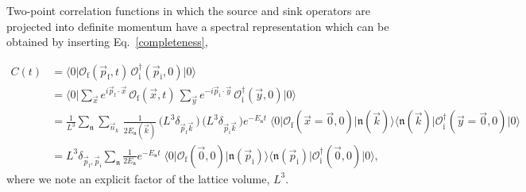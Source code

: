 \documentclass[twocolumn,amsmath,amssymb,prd,10pt,floatfix, 
superscriptaddress,nofootinbib, showpacs, preprintnumbers]{revtex4-1}
\begin{document}
Two-point correlation functions in which the source and sink operators are projected into definite momentum have a spectral representation which can be obtained by inserting Eq.~\ref{completeness},
\begin{widetext}
\begin{align*}
C(t) 	&= \big\langle 0 \big| \mathcal{O}^{\,}_\mathrm{f}(\vec{p}_{\mathrm{f}}, t) \, \mathcal{O}^\dag_\mathrm{i}(\vec{p}_\mathrm{i}, 0) \big| 0 \big\rangle \\ 
		&= \big\langle 0 \big| \sum\nolimits_{\vec{x}} e^{i \vec{p}_\mathrm{f}\cdot \vec{x} }\,  \mathcal{O}^{\,}_\mathrm{f}(\vec{x}, t)\, 
		\sum\nolimits_{\vec{y}} e^{-i \vec{p}_\mathrm{i}\cdot \vec{y} }\,  \mathcal{O}^{\dag}_\mathrm{i}(\vec{y}, 0) \big| 0 \big\rangle \\
		&= \frac{1}{L^3} \sum_\mathfrak{n} \sum_{\vec{n}_k} \, \frac{1}{2 E_\mathfrak{n}(\vec{k}) } 
		\,\big( L^3 \delta_{\vec{p}_\mathrm{f} \vec{k}} \,\big)
		\,\big( L^3 \delta_{\vec{p}_\mathrm{i} \vec{k}} \,\big) 
		e^{-E_{\mathfrak{n}} t} \; 
		\big\langle 0 \big| \mathcal{O}_\mathrm{f}(\vec{x}=\vec{0}, 0) \big| \mathfrak{n}(\vec{k}) \big\rangle
		\big\langle \mathfrak{n}(\vec{k}) \big| \mathcal{O}^\dag_\mathrm{i}(\vec{y}=\vec{0}, 0) \big| 0\big\rangle \\
		&= L^3 \delta_{\vec{p}_\mathrm{f} , \vec{p}_\mathfrak{i}} \sum_\mathfrak{n} \frac{1}{2 E_\mathfrak{n} } 
		e^{-E_{\mathfrak{n}} t} \; 
		\big\langle 0 \big| \mathcal{O}_\mathrm{f}(\vec{0}, 0) \big| \mathfrak{n}(\vec{p}_\mathrm{i}) \big\rangle
		\big\langle \mathfrak{n}(\vec{p}_\mathrm{i}) \big| \mathcal{O}^\dag_\mathrm{i}(\vec{0}, 0) \big| 0\big\rangle,
\end{align*}
where we note an explicit factor of the lattice volume, $L^3$. 


\end{widetext}
\end{document}
